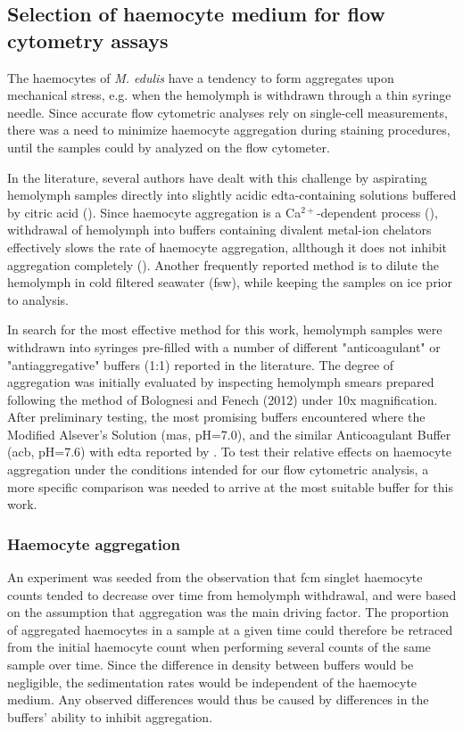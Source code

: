 \subsection{Selection of haemocyte medium for flow cytometry assays}
The haemocytes of \emph{M. edulis} have a tendency to form aggregates upon mechanical stress, e.g. when the hemolymph is withdrawn through a thin syringe needle. Since accurate flow cytometric analyses rely on single-cell measurements, there was a need to minimize haemocyte aggregation during staining procedures, until the samples could by analyzed on the flow cytometer.

In the literature, several authors have dealt with this challenge by aspirating hemolymph samples directly into slightly acidic \acrshort{edta}-containing solutions buffered by citric acid (\cite{Söderhall1983, Bachere1988, LeFoll2010}). Since haemocyte aggregation is a Ca$^{2+}$-dependent process (\cite{Torreilles1999, Chen1995}), withdrawal of hemolymph into buffers containing divalent metal-ion chelators effectively slows the rate of haemocyte aggregation, allthough it does not inhibit aggregation completely (\cite{Chen1995}). Another frequently reported method is to dilute the hemolymph in cold filtered seawater (\acrshort{fsw}), while keeping the samples on ice prior to analysis. 

In search for the most effective method for this work, hemolymph samples were withdrawn into syringes pre-filled with a number of different "anticoagulant" or "antiaggregative" buffers (1:1) reported in the literature. The degree of aggregation was initially evaluated by inspecting hemolymph smears prepared following the method of Bolognesi and Fenech (2012) under 10x magnification. After preliminary testing, the most promising buffers encountered where the Modified Alsever's Solution (\acrshort{mas}, pH=7.0), and the similar Anticoagulant Buffer (\acrshort{acb}, pH=7.6) with \acrshort{edta} reported by \cite{Pipe1997}. To test their relative effects on haemocyte aggregation under the conditions intended for our flow cytometric analysis, a more specific comparison was needed to arrive at the most suitable buffer for this work.

\subsubsection{Haemocyte aggregation}
An experiment was seeded from the observation that \acrshort{fcm} singlet haemocyte counts tended to decrease over time from hemolymph withdrawal, and were based on the assumption that aggregation was the main driving factor. The proportion of aggregated haemocytes in a sample at a given time could therefore be retraced from the initial haemocyte count when performing several counts of the same sample over time. Since the difference in density between buffers would be negligible, the sedimentation rates would be independent of the haemocyte medium. Any observed differences would thus be caused by differences in the buffers' ability to inhibit aggregation.

